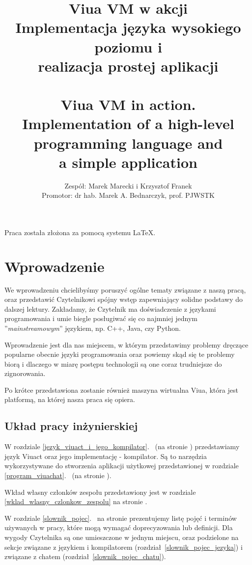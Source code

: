 \documentclass[11pt,oneside,a4paper,titlepage,onecolumn]{book}
\author{Zespół: Marek Marecki i Krzysztof Franek\\Promotor: dr hab. Marek A. Bednarczyk, prof. PJWSTK}
\title{%
    Viua VM w akcji \\
    \large
    Implementacja języka wysokiego poziomu i \\
    realizacja prostej aplikacji\\
    ~\\
    Viua VM in action. Implementation of a high-level programming language and\\ a simple application}
\begin{document}

\maketitle

\tableofcontents
\listoffigures

Praca została złożona za pomocą systemu \LaTeX.

\newpage

\chapter{Wprowadzenie}

We wprowadzeniu chcielibyśmy poruszyć ogólne tematy związane z naszą pracą, oraz przedstawić Czytelnikowi
spójny wstęp zapewniający solidne podstawy do dalszej lektury. Zakładamy, że Czytelnik ma doświadczenie z
językami programowania i umie biegle posługiwać się co najmniej jednym ''\emph{mainstreamowym}'' językiem, np.
C++, Java, czy Python.

Wprowadzenie jest dla nas miejscem, w którym przedstawimy problemy dręczące popularne obecnie języki
programowania oraz powiemy skąd się te problemy biorą i dlaczego w miarę postępu technologii są one coraz
trudniejsze do zignorowania.

Po krótce przedstawiona zostanie również maszyna wirtualna Viua, która jest platformą, na której nasza praca
się opiera.

\section{Układ pracy inżynierskiej}

W rozdziale \ref{jezyk_viuact_i_jego_kompilator}.~ (na stronie
\pageref{jezyk_viuact_i_jego_kompilator}) przedstawiamy język Viuact oraz jego implementację - kompilator.
Są to narzędzia wykorzystywane do stworzenia aplikacji użytkowej przedstawionej w rozdziale
\ref{program_viuachat}.~ (na stronie \pageref{program_viuachat}).

Wkład własny członków zespołu przedstawiony jest w rozdziale \ref{wklad_wlasny_czlonkow_zespolu} na stronie
\pageref{wklad_wlasny_czlonkow_zespolu}.

W rozdziale \ref{slownik_pojec}.~ na stronie \pageref{slownik_pojec} prezentujemy listę
pojęć i terminów używanych w pracy, które mogą wymagać doprecyzowania lub definicji. Dla wygody Czytelnika są
one umieszczone w jednym miejscu, oraz podzielone na sekcje związane z językiem i kompilatorem
(rozdział~\ref{slownik_pojec_jezyka}) i związane z chatem (rozdział~\ref{slownik_pojec_chatu}).
\end{document}
